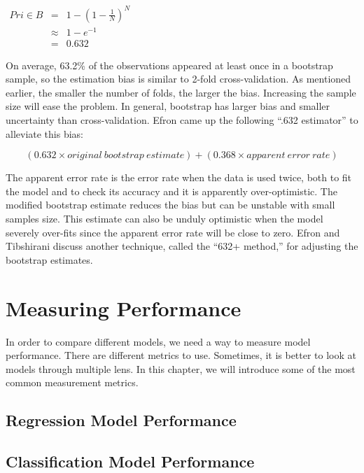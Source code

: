 \documentclass[12pt,]{krantz}
\begin{document}
\(\begin{array}{ccc} Pr{i\in B} & = & 1-\left(1-\frac{1}{N}\right)^{N}\\  & \approx & 1-e^{-1}\\  & = & 0.632 \end{array}\)

On average, 63.2\% of the observations appeared at least once in a bootstrap sample, so the estimation bias is similar to 2-fold cross-validation. As mentioned earlier, the smaller the number of folds, the larger the bias. Increasing the sample size will ease the problem. In general, bootstrap has larger bias and smaller uncertainty than cross-validation. Efron came up the following ``.632 estimator'' to alleviate this bias:

\[(0.632 × original\ bootstrap\ estimate) + (0.368 × apparent\ error\ rate)\]

The apparent error rate is the error rate when the data is used twice, both to fit the model and to check its accuracy and it is apparently over-optimistic. The modified bootstrap estimate reduces the bias but can be unstable with small samples size. This estimate can also be unduly optimistic when the model severely over-fits since the apparent error rate will be close to zero. Efron and Tibshirani \citep{b632plus} discuss another technique, called the ``632+ method,'' for adjusting the bootstrap estimates.

\hypertarget{measuring-performance}{%
\chapter{Measuring Performance}\label{measuring-performance}}

In order to compare different models, we need a way to measure model performance. There are different metrics to use. Sometimes, it is better to look at models through multiple lens. In this chapter, we will introduce some of the most common measurement metrics.

\hypertarget{regression-model-performance}{%
\section{Regression Model Performance}\label{regression-model-performance}}

\hypertarget{classification-model-performance}{%
\section{Classification Model Performance}\label{classification-model-performance}}
\end{document}
